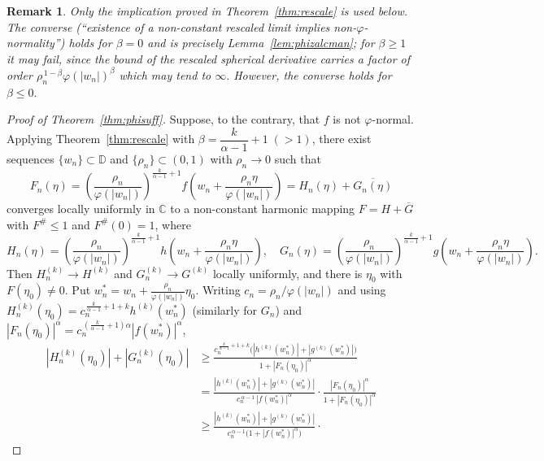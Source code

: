 \documentclass[10pt,a4paper]{amsart}
\newtheorem{remark}[theorem]{Remark}
\newcommand{\D}{\mathbb{D}}
\newcommand{\C}{\mathbb{C}}
\begin{document}
\begin{remark}\label{rem:converse}
Only the implication proved in Theorem~\ref{thm:rescale} is used below. The converse
(``existence of a non-constant rescaled limit implies non-$\varphi$-normality'') holds for
$\beta=0$ and is precisely Lemma~\ref{lem:phizalcman}; for $\beta\ge1$ it may fail, since the bound of the rescaled spherical derivative carries a factor of order
$\rho_{n}^{\,1-\beta}\varphi(|w_{n}|)^{\beta}$ which may tend to $\infty.$  However, the converse holds for $\beta\leq 0.$ 
\end{remark}

\begin{proof}[Proof of Theorem~\textup{\ref{thm:phisuff}}]
Suppose, to the contrary, that $f$ is not $\varphi$-normal. Applying
Theorem~\ref{thm:rescale} with $\beta=\dfrac{k}{\alpha-1}+1\;(>1)$, there exist sequences
$\{w_{n}\}\subset\D$ and $\{\rho_{n}\}\subset(0,1)$ with $\rho_{n}\to0$ such that
\[
F_{n}(\eta)=\left(\frac{\rho_{n}}{\varphi(|w_{n}|)}\right)^{\frac{k}{\alpha-1}+1}
f\!\left(w_{n}+\frac{\rho_{n}\eta}{\varphi(|w_{n}|)}\right)
=H_{n}(\eta)+\overline{G_{n}(\eta)}
\]
converges locally uniformly in $\C$ to a non-constant harmonic mapping
$F=H+\overline G$ with $F^{\#}\le1$ and $F^{\#}(0)=1$, where
\[
H_{n}(\eta)=\left(\frac{\rho_{n}}{\varphi(|w_{n}|)}\right)^{\frac{k}{\alpha-1}+1}
h\!\left(w_{n}+\frac{\rho_{n}\eta}{\varphi(|w_{n}|)}\right),\quad
G_{n}(\eta)=\left(\frac{\rho_{n}}{\varphi(|w_{n}|)}\right)^{\frac{k}{\alpha-1}+1}
g\!\left(w_{n}+\frac{\rho_{n}\eta}{\varphi(|w_{n}|)}\right).
\]
Then $H_{n}^{(k)}\to H^{(k)}$ and $G_{n}^{(k)}\to G^{(k)}$ locally uniformly, and there is
$\eta_{0}$ with $F(\eta_{0})\neq0$. Put $w_{n}^{*}=w_{n}+\tfrac{\rho_{n}}{\varphi(|w_{n}|)}\eta_{0}$.
Writing $c_{n}=\rho_{n}/\varphi(|w_{n}|)$ and using
$H_{n}^{(k)}(\eta_{0})=c_{n}^{\,\frac{k}{\alpha-1}+1+k}h^{(k)}(w_{n}^{*})$ (similarly for
$G_{n}$) and $|F_{n}(\eta_{0})|^{\alpha}=c_{n}^{\,(\frac{k}{\alpha-1}+1)\alpha}|f(w_{n}^{*})|^{\alpha}$,
\begin{align*}
|H_{n}^{(k)}(\eta_{0})|+|G_{n}^{(k)}(\eta_{0})|
&\ge\frac{c_{n}^{\,\frac{k}{\alpha-1}+1+k}\big(|h^{(k)}(w_{n}^{*})|+|g^{(k)}(w_{n}^{*})|\big)}
{1+|F_{n}(\eta_{0})|^{\alpha}}\\[0.4ex]
&=\frac{|h^{(k)}(w_{n}^{*})|+|g^{(k)}(w_{n}^{*})|}{c_{n}^{\,\alpha-1}\,|f(w_{n}^{*})|^{\alpha}}\cdot
\frac{|F_{n}(\eta_{0})|^{\alpha}}{1+|F_{n}(\eta_{0})|^{\alpha}}\\[0.4ex]
&\ge\frac{|h^{(k)}(w_{n}^{*})|+|g^{(k)}(w_{n}^{*})|}
{c_{n}^{\,\alpha-1}\big(1+|f(w_{n}^{*})|^{\alpha}\big)}\cdot

\end{align*}
\end{proof}
\end{document}
